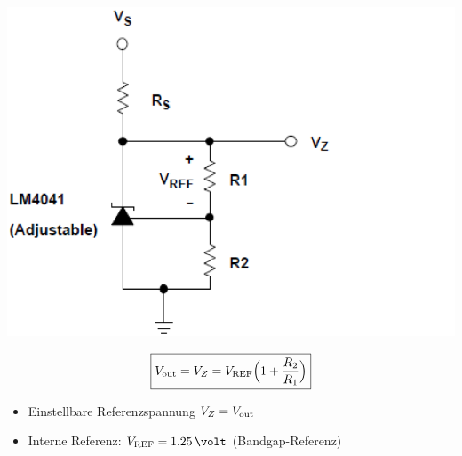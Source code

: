 
\begin{minipage}[c]{0.25\columnwidth}
    \includegraphics[width=\columnwidth]{images/beispiel_bandgap.png}
\end{minipage}
\hfill
\begin{minipage}[c]{0.72\columnwidth}
    $$ \boxed{ V_{\rm out} = V_Z = V_{\rm REF} \Big( 1 + \frac{R_2}{R_1} \Big) } $$
    \begin{itemize}
        \item Einstellbare Referenzspannung $V_Z = V_{\rm out}$
        \item Interne Referenz: $V_{\rm REF} = 1.25 \, \volt$ (Bandgap-Referenz)
    \end{itemize}
\end{minipage}

